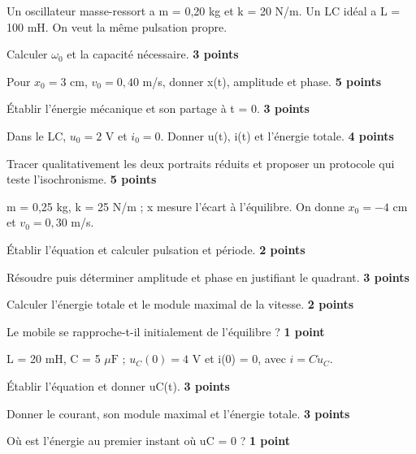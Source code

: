 Un oscillateur masse-ressort a m = 0,20 kg et k = 20 N/m. Un LC idéal a L = 100 mH. On veut la même pulsation propre.\begin{questions}
\item Calculer $\omega_0$ et la capacité nécessaire. \textbf{3 points}
\item Pour $x_0=3$ cm, $v_0=0{,}40$ m/s, donner x(t), amplitude et phase. \textbf{5 points}
\item Établir l’énergie mécanique et son partage à t = 0. \textbf{3 points}
\item Dans le LC, $u_0=2$ V et $i_0=0$. Donner u(t), i(t) et l’énergie totale. \textbf{4 points}
\item Tracer qualitativement les deux portraits réduits et proposer un protocole qui teste l’isochronisme. \textbf{5 points}
\end{questions}


m = 0,25 kg, k = 25 N/m ; x mesure l’écart à l’équilibre. On donne $x_0=-4$ cm et $v_0=0{,}30$ m/s.
\begin{questions}
\item Établir l’équation et calculer pulsation et période. \textbf{2 points}
\item Résoudre puis déterminer amplitude et phase en justifiant le quadrant. \textbf{3 points}
\item Calculer l’énergie totale et le module maximal de la vitesse. \textbf{2 points}
\item Le mobile se rapproche-t-il initialement de l’équilibre ? \textbf{1 point}
\end{questions}
L = 20 mH, C = 5 $\mu\mathrm{ F}$ ; $u_C(0)=4$ V et i(0) = 0, avec $i=C\dot u_C$.
\begin{questions}
\item Établir l’équation et donner uC(t). \textbf{3 points}
\item Donner le courant, son module maximal et l’énergie totale. \textbf{3 points}
\item Où est l’énergie au premier instant où uC = 0 ? \textbf{1 point}
\end{questions}


